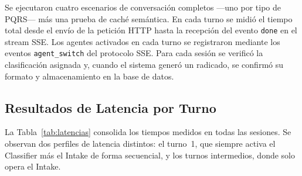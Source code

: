 \documentclass[runningheads]{llncs}
\begin{document}
Se ejecutaron cuatro escenarios de conversación completos —uno por tipo de PQRS— más una prueba de caché semántica. En cada turno se midió el tiempo total desde el envío de la petición HTTP hasta la recepción del evento \texttt{done} en el stream SSE. Los agentes activados en cada turno se registraron mediante los eventos \texttt{agent\_switch} del protocolo SSE. Para cada sesión se verificó la clasificación asignada y, cuando el sistema generó un radicado, se confirmó su formato y almacenamiento en la base de datos.

\subsection{Resultados de Latencia por Turno}

La Tabla~\ref{tab:latencias} consolida los tiempos medidos en todas las sesiones. Se observan dos perfiles de latencia distintos: el turno~1, que siempre activa el Classifier más el Intake de forma secuencial, y los turnos intermedios, donde solo opera el Intake.
\end{document}
